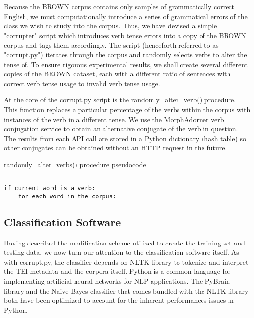\documentclass{article}
\begin{document}
Because the BROWN corpus contains only samples of grammatically correct English, we must computationally introduce a series of grammatical errors of the class we wish to study into the corpus. Thus, we have devised a simple "corrupter" script which introduces verb tense errors into a copy of the BROWN corpus and tags them accordingly. The script (henceforth referred to as "corrupt.py")
iterates through the corpus and randomly selects verbs to alter the tense of. To ensure rigorous experimental results, we shall create several different copies of the BROWN dataset, each with a different ratio of sentences with correct verb tense usage to invalid verb tense usage. 
    

At the core of the corrupt.py script is the randomly\_alter\_verb() procedure. This function  replaces a particular percentage of the verbs within the corpus with instances of the verb in a different tense. We use the MorphAdorner verb conjugation service \citep{MorphAdorner} to obtain  an alternative conjugate of the verb in question. The results from each API call are stored in a Python dictionary (hash table) so other conjugates can be obtained without an HTTP request in the future. 
\begin{center}
\begin{algorithm}[H]
 \caption{randomly\_alter\_verbs() procedure pseudocode}
 
 
\end{algorithm}

\begin{lstlisting}

if current word is a verb:
    for each word in the corpus:

\end{lstlisting}
\end{center}
\subsection{Classification Software}
Having described the modification scheme utilized to create the training set and testing data, we now turn our attention to the classification software itself. As with corrupt.py, the classifier depends on NLTK library to tokenize and interpret the TEI metadata and the corpora itself. Python is a common language for implementing artificial neural networks for NLP applications. The PyBrain library and the Naive Bayes classifier that comes bundled with the NLTK library both have been optimized to account for the inherent performances issues in Python. 
\end{document}
